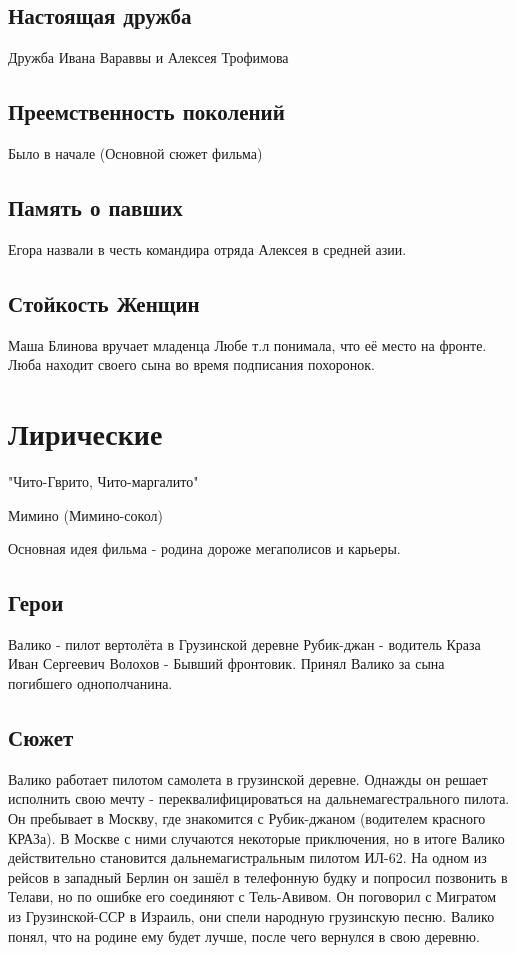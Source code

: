 \documentclass[a4paper,14pt]{article}
\begin{document}
\subsection{Настоящая дружба}
Дружба Ивана Вараввы и Алексея Трофимова

\subsection{Преемственность поколений}
Было в начале (Основной сюжет фильма)


\subsection{Память о павших}
Егора назвали в честь командира отряда Алексея в средней азии.



\subsection{Стойкость Женщин}
Маша Блинова вручает младенца Любе т.л понимала, что её место на фронте.
Люба находит своего сына во время подписания похоронок.


\section{Лирические}
"Чито-Гврито, Чито-маргалито"

Мимино (Мимино-сокол)

Основная идея фильма -  родина дороже мегаполисов и карьеры.

\subsection{Герои}
Валико - пилот вертолёта в Грузинской деревне
Рубик-джан - водитель Краза
Иван Сергеевич Волохов - Бывший фронтовик. Принял Валико за сына погибшего однополчанина.


\subsection{Сюжет}
Валико работает пилотом самолета в грузинской деревне. Однажды он решает исполнить свою мечту - переквалифицироваться
на дальнемагестрального пилота.
Он пребывает в Москву, где знакомится с Рубик-джаном (водителем красного КРАЗа).
В Москве с ними случаются некоторые приключения, но в итоге Валико действительно становится дальнемагистральным пилотом ИЛ-62.
На одном из рейсов в западный Берлин он зашёл в телефонную будку и попросил позвонить в Телави, но по ошибке его соединяют с
Тель-Авивом. Он поговорил с Мигратом из Грузинской-ССР в Израиль, они спели народную грузинскую песню. Валико понял, что на родине ему будет лучше, после чего вернулся в свою деревню.
\end{document}
